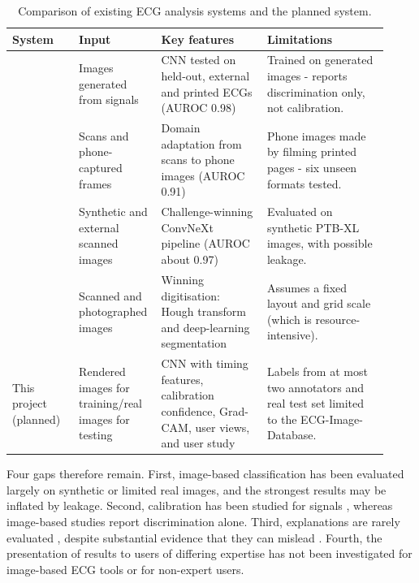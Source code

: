 \documentclass[12pt,nonacm,acmlarge,titlepage,screen]{acmart}
\begin{document}
\begin{table}[H]
  \centering
  \footnotesize
  \renewcommand{\arraystretch}{1.0}
  \caption{Comparison of existing ECG analysis systems and the planned system.}
  \label{tab:existing-systems}
  \begin{tabular}{@{}P{0.17\linewidth} P{0.17\linewidth} P{0.27\linewidth} P{0.31\linewidth}@{}}
    \toprule
    \textbf{System} & \textbf{Input} & \textbf{Key features} & \textbf{Limitations} \\
    \midrule
    \citet{sangha_automated_2022} &
      Images generated from signals &
      CNN tested on held-out, external and printed ECGs (AUROC 0.98) &
      Trained on generated images - reports discrimination only, not calibration. \\
    \citet{gliner_domain_2023} &
      Scans and phone-captured frames &
      Domain adaptation from scans to phone images (AUROC 0.91) &
      Phone images made by filming printed pages - six unseen formats tested. \\
    \citet{wang_pipeline_2025} &
      Synthetic and external scanned images &
      Challenge-winning ConvNeXt pipeline (AUROC about 0.97) &
      Evaluated on synthetic PTB-XL images, with possible leakage. \\
    \citet{krones_combining_2024} &
      Scanned and photographed images &
      Winning digitisation: Hough transform and deep-learning segmentation &
      Assumes a fixed layout and grid scale (which is resource-intensive). \\
    \midrule
    \bottomrule
      This project (planned) &
      Rendered images for training/real images for testing &
      CNN with timing features, calibration confidence, Grad-CAM, user views, and user study &
      Labels from at most two annotators and  real test set limited to the ECG-Image-Database. \\
    \bottomrule
  \end{tabular}
\end{table}

Four gaps therefore remain. First, image-based classification has been evaluated largely on synthetic or limited real images, and the strongest results may be inflated by leakage. Second, calibration has been studied for signals \cite{chen_quantifying_2022}, whereas image-based studies report discrimination alone. Third, explanations are rarely evaluated \cite{salih_review_2024}, despite substantial evidence that they can mislead \cite{adebayo_sanity_2018,ghassemi_false_2021}. Fourth, the presentation of results to users of differing expertise has not been investigated for image-based ECG tools or for non-expert users.
\end{document}
